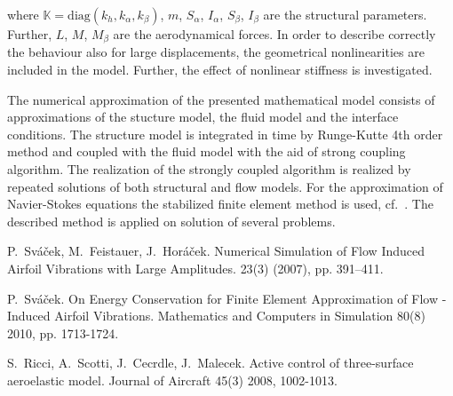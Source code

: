 where ${\mathbb K}=\mbox{diag}( k_{h},k_{\alpha},k_{\beta})$, $m$, $S_\alpha$, $I_\alpha$, $S_\beta$, $I_\beta$ are the structural parameters. Further, $L$, $M$, $M_\beta$ are the aerodynamical forces. In order to describe correctly the behaviour also for large displacements, the geometrical nonlinearities are included in the model. Further, the effect of nonlinear stiffness is investigated.

The numerical approximation of the presented mathematical model consists of approximations of the stucture model, the fluid model and the interface conditions. The structure model is integrated in time by Runge-Kutte 4th order method and coupled with the fluid model with the aid of strong coupling algorithm. The realization of the strongly coupled algorithm is realized by repeated solutions of both structural and flow models. For the approximation of Navier-Stokes equations the stabilized finite element method is used, cf.~\cite{Sva1}. The described method is applied on solution of several problems.


\begin{thebibliography}{10}
{\sc P.~Sv\'{a}\v{c}ek, M.~Feistauer, J.~Hor\'{a}\v{c}ek}.
\newblock Numerical Simulation of Flow Induced Airfoil Vibrations with Large Amplitudes.
 {23}(3) (2007), pp. 391--411.

{\sc P.~Sv\'{a}\v{c}ek}. 
\newblock On Energy Conservation for Finite Element Approximation of Flow - Induced Airfoil Vibrations.
\newblock Mathematics and Computers in Simulation 80(8) 2010, pp. 1713-1724.


{\sc S.~Ricci, A.~Scotti, J.~Cecrdle, J.~Malecek}.
\newblock Active control of three-surface aeroelastic model.
\newblock Journal of Aircraft 45(3) 2008, 1002-1013.
\end{thebibliography}